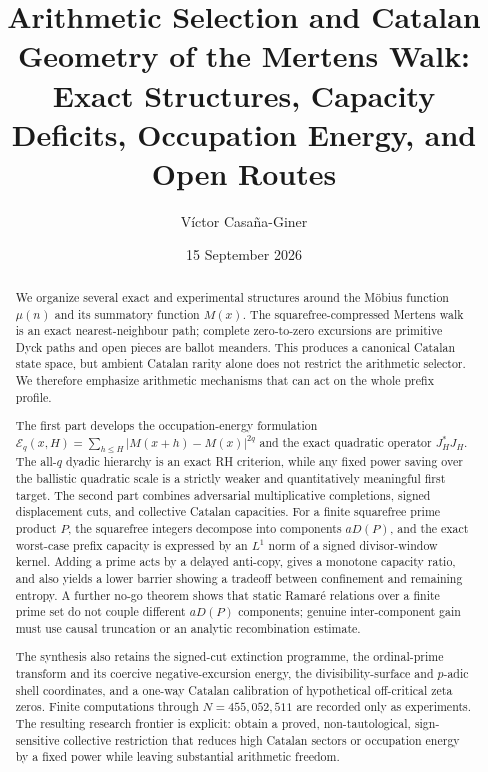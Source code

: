 \documentclass[11pt]{amsart}
\title[Arithmetic Selection and Catalan Geometry]{Arithmetic Selection and Catalan Geometry of the Mertens Walk:\\
Exact Structures, Capacity Deficits, Occupation Energy, and Open Routes}
\author{V\'ictor Casa\~na-Giner}
\date{15 September 2026}
\numberwithin{equation}{section}
\theoremstyle{plain}
\theoremstyle{definition}
\theoremstyle{remark}
\newcommand{\Mert}{M}
\newcommand{\Mob}{\mu}
\begin{document}
\begin{abstract}
We organize several exact and experimental structures around the M\"obius function
$\Mob(n)$ and its summatory function $\Mert(x)$.  The squarefree-compressed Mertens
walk is an exact nearest-neighbour path; complete zero-to-zero excursions are
primitive Dyck paths and open pieces are ballot meanders.  This produces a canonical
Catalan state space, but ambient Catalan rarity alone does not restrict the arithmetic
selector.  We therefore emphasize arithmetic mechanisms that can act on the whole
prefix profile.

The first part develops the occupation-energy formulation
$\mathcal E_q(x,H)=\sum_{h\le H}|\Mert(x+h)-\Mert(x)|^{2q}$ and the exact quadratic
operator $J_H^*J_H$.  The all-$q$ dyadic hierarchy is an exact RH criterion, while any
fixed power saving over the ballistic quadratic scale is a strictly weaker and
quantitatively meaningful first target.  The second part combines adversarial
multiplicative completions, signed displacement cuts, and collective Catalan capacities.
For a finite squarefree prime product $P$, the squarefree integers decompose into
components $aD(P)$, and the exact worst-case prefix capacity is expressed by an
$L^1$ norm of a signed divisor-window kernel.  Adding a prime acts by a delayed
anti-copy, gives a monotone capacity ratio, and also yields a lower barrier showing a
tradeoff between confinement and remaining entropy.  A further no-go theorem shows
that static Ramar\'e relations over a finite prime set do not couple different
$aD(P)$ components; genuine inter-component gain must use causal truncation or an
analytic recombination estimate.

The synthesis also retains the signed-cut extinction programme, the ordinal-prime
transform and its coercive negative-excursion energy, the divisibility-surface and
$p$-adic shell coordinates, and a one-way Catalan calibration of hypothetical
off-critical zeta zeros.  Finite computations through $N=455{,}052{,}511$ are recorded
only as experiments.  The resulting research frontier is explicit: obtain a proved,
non-tautological, sign-sensitive collective restriction that reduces high Catalan
sectors or occupation energy by a fixed power while leaving substantial arithmetic
freedom.
\end{abstract}

\maketitle
\tableofcontents
\bigskip
\end{document}
